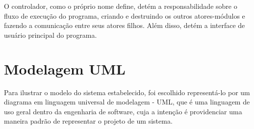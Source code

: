             O controlador, como o próprio nome define, detém a responsabilidade sobre o fluxo de execução do programa, criando e destruindo os outros atores-módulos e fazendo a comunicação entre seus atores filhos. Além disso, detém a interface de usuário principal do programa. 
    
    \section{Modelagem UML}
        
        Para ilustrar o modelo do sistema estabelecido, foi escolhido representá-lo por um diagrama em linguagem universal de modelagem - UML, que é uma linguagem de uso geral dentro da engenharia de software, cuja a intenção é providenciar uma maneira padrão de representar o projeto de um sistema.
        
